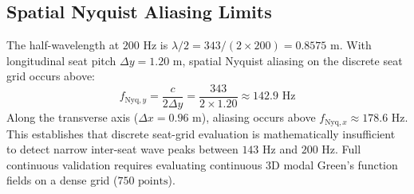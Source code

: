 \documentclass[11pt,a4paper,titlepage]{article}
\begin{document}
\subsection{Spatial Nyquist Aliasing Limits}
The half-wavelength at $200\text{ Hz}$ is $\lambda / 2 = 343 / (2 \times 200) = 0.8575\text{ m}$. With longitudinal seat pitch $\Delta y = 1.20\text{ m}$, spatial Nyquist aliasing on the discrete seat grid occurs above:
\begin{equation}
    f_{\text{Nyq}, y} = \frac{c}{2 \Delta y} = \frac{343}{2 \times 1.20} \approx 142.9\text{ Hz}
\end{equation}
Along the transverse axis ($\Delta x = 0.96\text{ m}$), aliasing occurs above $f_{\text{Nyq}, x} \approx 178.6\text{ Hz}$. This establishes that discrete seat-grid evaluation is mathematically insufficient to detect narrow inter-seat wave peaks between $143\text{ Hz}$ and $200\text{ Hz}$. Full continuous validation requires evaluating continuous 3D modal Green's function fields on a dense grid ($750\text{ points}$).
\end{document}
